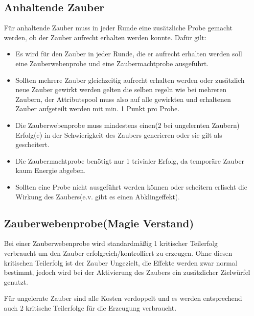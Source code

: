 \subsection{Anhaltende Zauber}
Für anhaltende Zauber muss in jeder Runde eine zusätzliche Probe gemacht werden, ob der Zauber aufrecht erhalten werden konnte.
Dafür gilt:\begin{itemize}
\item Es wird für den Zauber in jeder Runde, die er aufrecht erhalten werden soll eine Zauberwebenprobe und eine Zaubermachtprobe ausgeführt.
\item Sollten mehrere Zauber gleichzeitig aufrecht erhalten werden oder zusätzlich neue Zauber gewirkt werden gelten die selben regeln wie bei mehreren Zaubern, der Attributspool muss also auf alle gewirkten und erhaltenen Zauber aufgeteilt werden mit min. 1 Punkt pro Probe.
\item Die Zauberwebenprobe muss mindestens einen(2 bei ungelernten Zaubern) Erfolg(e) in der Schwierigkeit des Zaubers generieren oder sie gilt als gescheitert.
\item Die Zaubermachtprobe benötigt nur 1 trivialer Erfolg, da temporäre Zauber kaum Energie abgeben.
\item Sollten eine Probe nicht ausgeführt werden können oder scheitern erlischt die Wirkung des Zaubers(e.v. gibt es einen Abklingeffekt).
\end{itemize}

\subsection{Zauberwebenprobe(Magie Verstand)}

Bei einer Zauberwebenprobe wird standardmäßig 1 kritischer Teilerfolg verbraucht um den Zauber erfolgreich/kontrolliert zu erzeugen.
Ohne diesen kritischen Teilerfolg ist der Zauber Ungezielt, die Effekte werden zwar normal bestimmt, jedoch wird bei der Aktivierung des Zaubers ein zusätzlicher Zielwürfel genutzt.

Für ungelernte Zauber sind alle Kosten verdoppelt und es werden entsprechend auch 2 kritische Teilerfolge für die Erzeugung verbraucht.


